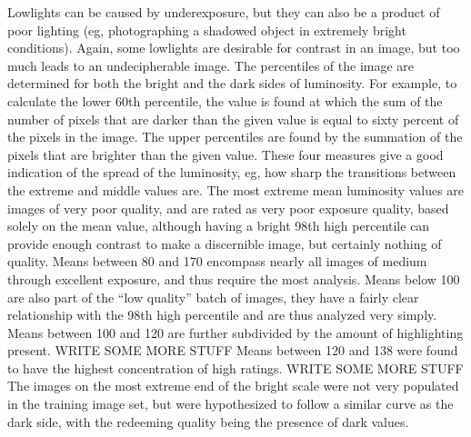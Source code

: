 \documentclass[twocolumn]{article}
\begin{document}
Lowlights can be caused by underexposure, but they can also be a product of poor lighting (eg, photographing a shadowed object in extremely bright conditions). Again, some lowlights are desirable for contrast in an image, but too much leads to an undecipherable image.
The percentiles of the image are determined for both the bright and the dark sides of luminosity. For example, to calculate the lower 60th percentile, the value is found at which the sum of the number of pixels that are darker than the given value is equal to sixty percent of the pixels in the image. The upper percentiles are found by the summation of the pixels that are brighter than the given value. These four measures give a good indication of the spread of the luminosity, eg, how sharp the transitions between the extreme and middle values are.
The most extreme mean luminosity values are images of very poor quality, and are rated as very poor exposure quality, based solely on the mean value, although having a bright 98th high percentile can provide enough contrast to make a discernible image, but certainly nothing of quality. Means between 80 and 170 encompass nearly all images of medium through excellent exposure, and thus require the most analysis. Means below 100 are also part of the “low quality” batch of images, they have a fairly clear relationship with the 98th high percentile and are thus analyzed very simply.
Means between 100 and 120 are further subdivided by the amount of highlighting present. WRITE SOME MORE STUFF
Means between 120 and 138 were found to have the highest concentration of high ratings. WRITE SOME MORE STUFF
The images on the most extreme end of the bright scale were not very populated in the training image set, but were hypothesized to follow a similar curve as the dark side, with the redeeming quality being the presence of dark values.
\end{document}
